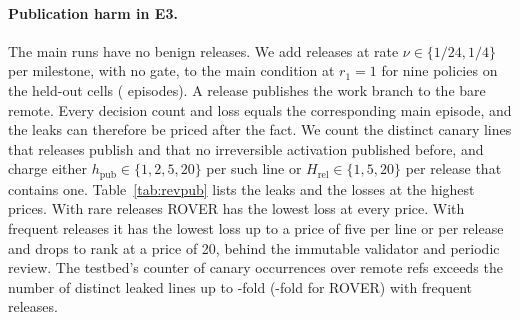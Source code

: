 \documentclass[11pt]{article}
\theoremstyle{definition}
\begin{document}
\begin{table}[h]
\centering
\caption{E1, gap to the optimal loss in \% for the myopic rule, the myopic rule with the DP's recovery
decisions, the one-step lookahead with blind recovery, and the rollout controller without and with blind
recovery.}\label{tab:revos}

\end{table}

\paragraph{Publication harm in E3.} The main runs have no benign releases. We add releases at rate
$\nu\in\{1/24,1/4\}$ per milestone, with no gate, to the main condition at $r_1=1$ for nine policies on
the held-out cells (\PostPubEpisodes{} episodes). A release publishes the work branch to the bare remote.
Every decision count and loss equals the corresponding main episode, and the leaks can therefore be
priced after the fact. We count the distinct canary lines that releases publish and that no irreversible activation
published before, and charge either $h_{\mathrm{pub}}\in\{1,2,5,20\}$ per such line or
$H_{\mathrm{rel}}\in\{1,5,20\}$ per release that contains one. Table~\ref{tab:revpub} lists the leaks and
the losses at the highest prices. With rare releases ROVER has the lowest loss at every price. With
frequent releases it has the lowest loss up to a price of five per line or per release and drops to
rank \PostPubFreqWorstRank{} at a price of 20, behind the immutable validator and periodic review. The testbed's
counter of canary occurrences over remote refs exceeds the number of distinct leaked lines up to
\PostPubRatioMax-fold (\PostPubRatioRo-fold for ROVER) with frequent releases.

\begin{table}[h]
\centering
\caption{E3 with releases: distinct newly leaked canary lines per episode, share of episodes with a leak,
and mean loss with frequent releases without a publication price, at 20 per leaked line and at 20 per
contaminated release.}\label{tab:revpub}

\end{table}
\end{document}
